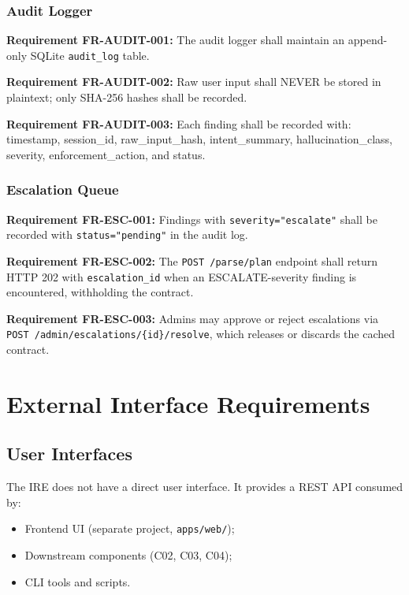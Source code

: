 \documentclass[10pt,journal,onecolumn]{IEEEtran}
\newcommand{\reqid}[1]{\textbf{#1}}
\begin{document}
\subsubsection{Audit Logger}
\reqid{Requirement FR-AUDIT-001:} The audit logger shall maintain an append-only SQLite \texttt{audit\_log} table.

\reqid{Requirement FR-AUDIT-002:} Raw user input shall NEVER be stored in plaintext; only SHA-256 hashes shall be recorded.

\reqid{Requirement FR-AUDIT-003:} Each finding shall be recorded with: timestamp, session\_id, raw\_input\_hash, intent\_summary, hallucination\_class, severity, enforcement\_action, and status.

\subsubsection{Escalation Queue}
\reqid{Requirement FR-ESC-001:} Findings with \texttt{severity="escalate"} shall be recorded with \texttt{status="pending"} in the audit log.

\reqid{Requirement FR-ESC-002:} The \texttt{POST /parse/plan} endpoint shall return HTTP 202 with \texttt{escalation\_id} when an ESCALATE-severity finding is encountered, withholding the contract.

\reqid{Requirement FR-ESC-003:} Admins may approve or reject escalations via \texttt{POST /admin/escalations/\{id\}/resolve}, which releases or discards the cached contract.
\section{External Interface Requirements}

\subsection{User Interfaces}
The IRE does not have a direct user interface. It provides a REST API consumed by:
\begin{itemize}
\item Frontend UI (separate project, \texttt{apps/web/});
\item Downstream components (C02, C03, C04);
\item CLI tools and scripts.
\end{itemize}
\end{document}

